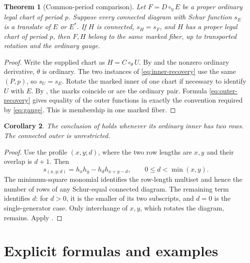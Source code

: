 \documentclass[11pt,a4paper]{amsart}
\numberwithin{equation}{section}
\theoremstyle{plain}
\newtheorem{theorem}{Theorem}[section]
\newtheorem{corollary}[theorem]{Corollary}
\theoremstyle{definition}
\begin{document}
\begin{theorem}[Common-period comparison]\label{thm:transport}
Let \(F=D\circ_\eta E\) be a proper ordinary legal chart of period \(p\).  Suppose every connected diagram with Schur function \(s_E\) is a translate of \(E\) or \(E^*\).  If \(H\) is connected, \(s_H=s_F\), and \(H\) has a proper legal chart of period \(p\), then \(F,H\) belong to the same marked fiber, up to transported rotation and the ordinary gauge.
\end{theorem}
\begin{proof}
Write the supplied chart as \(H=C\circ_\theta U\).  By  and the nonzero ordinary derivative, \(\theta\) is ordinary.  The two instances of \eqref{eq:inner-recovery} use the same \((P,p)\), so \(s_U=s_E\).  Rotate the marked inner of one chart if necessary to identify \(U\) with \(E\).  By , the marks coincide or are the ordinary pair.  Formula \eqref{eq:outer-recovery} gives equality of the outer functions in exactly the convention required by \eqref{eq:gauge}.  This is membership in one marked fiber.
\end{proof}

\begin{corollary}\label{cor:two-row}
The conclusion of  holds whenever its ordinary inner has two rows.  The connected outer is unrestricted.
\end{corollary}
\begin{proof}
Use the profile \((x,y;d)\), where the two row lengths are \(x,y\) and their overlap is \(d+1\).  Then
\[
 s_{(x,y;d)}=h_xh_y-h_dh_{x+y-d},\qquad 0\le d<\min(x,y).
\]
The minimum-square monomial identifies the row-length multiset and hence the number of rows of any Schur-equal connected diagram.  The remaining term identifies \(d\): for \(d>0\), it is the smaller of its two subscripts, and \(d=0\) is the single-generator case.  Only interchange of \(x,y\), which rotates the diagram, remains.  Apply .
\end{proof}

\section{Explicit formulas and examples}\label{sec:examples}
\end{document}
